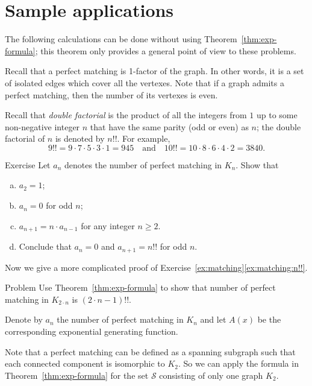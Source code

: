 \section*{Sample applications}

The following calculations can be done without using Theorem~\ref{thm:exp-formula};
this theorem only provides a general point of view to these problems.

Recall that a perfect matching is 1-factor of the graph. 
In other words, it is a set of isolated edges which cover all the vertexes.
Note that if a graph admits a perfect matching, then the number of its vertexes is even.

Recall that \emph{double factorial} is the product of all the integers from $1$ up to some non-negative integer $n$ that have the same parity (odd or even) as $n$;
the double factorial of $n$ is denoted by $n!!$.
For example, 
\[9!! = 9\cdot 7 \cdot 5 \cdot 3 \cdot  1 = 945
\quad\text{and}\quad
10!!=10\cdot8\cdot6\cdot4\cdot2=3840.
\]

\begin{thm}{Exercise}\label{ex:matching}
Let $a_n$ denotes the number of perfect matching in $K_n$.
Show that 
\begin{enumerate}[(a)]
 \item $a_2=1$;
 \item $a_n=0$ for odd $n$;
 \item\label{ex:matching:recursion} $a_{n+1}=n\cdot a_{n-1}$ for any integer $n\ge 2$.
 \item\label{ex:matching:n!!} 
 Conclude that $a_n=0$ and $a_{n+1}=n!!$ for odd $n$.
\end{enumerate}

\end{thm}

Now we give a more complicated proof of Exercise~\ref{ex:matching}\ref{ex:matching:n!!}.

\begin{thm}{Problem}
Use Theorem~\ref{thm:exp-formula} to show that number of perfect matching in $K_{2\cdot n}$ is $(2\cdot n-1)!!$.
\end{thm}

Denote by $a_n$ the number of perfect matching in $K_{n}$ and let $A(x)$ be the corresponding exponential generating function.

Note that a perfect matching can be defined as a spanning subgraph such that each connected component is isomorphic to $K_2$.
So we can apply the formula in Theorem~\ref{thm:exp-formula} for the set $\mathcal{S}$ consisting of only one graph $K_2$.

